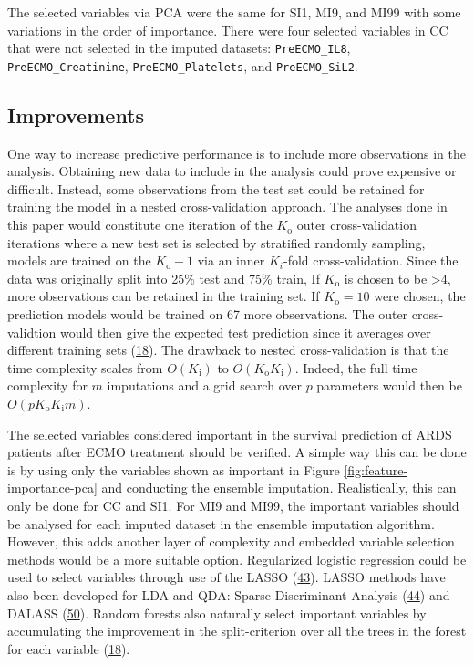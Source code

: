 \documentclass[12pt,]{article}
\begin{document}
The selected variables via PCA were the same for SI1, MI9, and MI99 with
some variations in the order of importance. There were four selected
variables in CC that were not selected in the imputed datasets:
\texttt{PreECMO\_IL8}, \texttt{PreECMO\_Creatinine},
\texttt{PreECMO\_Platelets}, and \texttt{PreECMO\_SiL2}.

\subsection{Improvements}\label{improvements}

One way to increase predictive performance is to include more
observations in the analysis. Obtaining new data to include in the
analysis could prove expensive or difficult. Instead, some observations
from the test set could be retained for training the model in a nested
cross-validation approach. The analyses done in this paper would
constitute one iteration of the \(K_\text{o}\) outer cross-validation
iterations where a new test set is selected by stratified randomly
sampling, models are trained on the \(K_\text{o}-1\) via an inner
\(K_{i}\)-fold cross-validation. Since the data was originally split
into 25\% test and 75\% train, If \(K_\text{o}\) is chosen to be
\textgreater{}4, more observations can be retained in the training set.
If \(K_\text{o}=10\) were chosen, the prediction models would be trained
on 67 more observations. The outer cross-validtion would then give the
expected test prediction since it averages over different training sets
(\protect\hyperlink{ref-hastie_elements_2009}{18}). The drawback to
nested cross-validation is that the time complexity scales from
\(O(K_\text{i})\) to \(O(K_\text{o}K_\text{i})\). Indeed, the full time
complexity for \(m\) imputations and a grid search over \(p\) parameters
would then be \(O(pK_\text{o}K_\text{i}m)\).

The selected variables considered important in the survival prediction
of ARDS patients after ECMO treatment should be verified. A simple way
this can be done is by using only the variables shown as important in
Figure \ref{fig:feature-importance-pca} and conducting the ensemble
imputation. Realistically, this can only be done for CC and SI1. For MI9
and MI99, the important variables should be analysed for each imputed
dataset in the ensemble imputation algorithm. However, this adds another
layer of complexity and embedded variable selection methods would be a
more suitable option. Regularized logistic regression could be used to
select variables through use of the LASSO
(\protect\hyperlink{ref-tibshirani_regression_1996}{43}). LASSO methods
have also been developed for LDA and QDA: Sparse Discriminant Analysis
(\protect\hyperlink{ref-clemmensen_sparse_2011}{44}) and DALASS
(\protect\hyperlink{ref-trendafilov_dalass:_2007}{50}). Random forests
also naturally select important variables by accumulating the
improvement in the split-criterion over all the trees in the forest for
each variable (\protect\hyperlink{ref-hastie_elements_2009}{18}).
\end{document}
